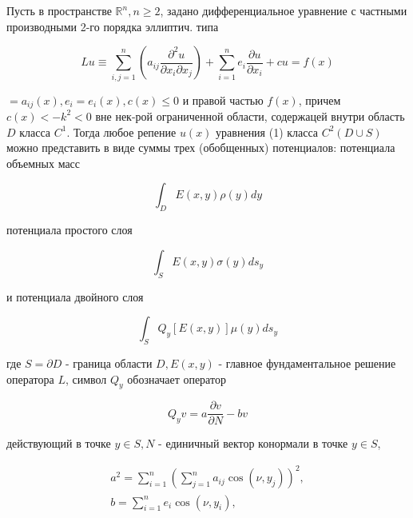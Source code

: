 \documentclass[10pt]{article}
\begin{document}
Пусть в пространстве $\mathbb{R}^{n}, n \geqslant 2$, задано дифференциальное уравнение с частными производными 2-го порядка эллиптич. типа



\[

L u \equiv \sum_{i, j=1}^{n}\left(a_{i j} \frac{\partial^{2} u}{\partial x_{i} \partial x_{j}}\right)+\sum_{i=1}^{n} e_{i} \frac{\partial u}{\partial x_{i}}+c u=f(x)

\]



$=a_{i j}(x), e_{i}=e_{i}(x), c(x) \leqslant 0$ и правой частью $f(x)$, причем $c(x)<-k^{2}<0$ вне нек-рой ограниченной области, содержацей внутри область $D$ класса $C^{1}$. Тогда любое репение $u(x)$ уравнения (1) класса $C^{2}(D \cup S)$ можно представить в виде суммы трех (обобщенных) потенциалов: потенциала объемных масс



\[

\int_{D} E(x, y) \rho(y) d y

\]



потенциала простого слоя



\[

\int_{S} E(x, y) \sigma(y) d s_{y}

\]



и потенциала двойного слоя



\[

\int_{S} Q_{y}[E(x, y)] \mu(y) d s_{y}

\]



где $S=\partial D$ - граница области $D, E(x, y)$ - главное фундаментальное решение оператора $L$, символ $Q_{y}$ обозначает оператор



\[

Q_{y} v=a \frac{\partial v}{\partial N}-b v

\]



действующий в точке $y \in S, N$ - единичный вектор конормали в точке $y \in S$,



\[

\begin{gathered}

a^{2}=\sum_{i=1}^{n}\left(\sum_{j=1}^{n} a_{i j} \cos \left(\nu, y_{j}\right)\right)^{2}, \\

b=\sum_{i=1}^{n} e_{i} \cos \left(\nu, y_{i}\right),

\end{gathered}

\]
\end{document}

